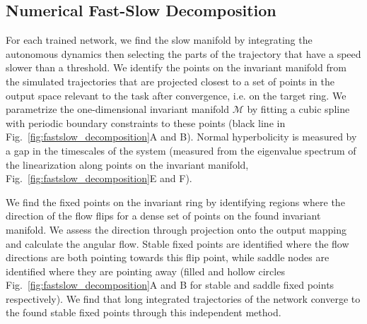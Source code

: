 \documentclass{article} %
\newcounter{ct}
\newcommand{\manifold}{\mathcal{M}}
\theoremstyle{definition}
\theoremstyle{remark}
\begin{document}
\subsection{Numerical Fast-Slow Decomposition}\label{sec:fastslowmethod}
For each trained network, we find the slow manifold by integrating the autonomous dynamics then selecting the parts of the trajectory that have a speed slower than a threshold.
We identify the points on the invariant manifold from the simulated trajectories that are projected closest to a set of points in the output space relevant to the task after convergence, i.e. on the target ring.
We parametrize the one-dimensional invariant manifold \(\manifold\) by fitting a cubic spline with periodic boundary constraints to these points (black line in Fig.~\ref{fig:fastslow_decomposition}A and B).
Normal hyperbolicity is measured by a gap in the timescales of the system (measured from the eigenvalue spectrum of the linearization along points on the invariant manifold, Fig.~\ref{fig:fastslow_decomposition}E and F).


We find the fixed points on the invariant ring by identifying regions where the direction of the flow flips for a dense set of points on the found invariant manifold.
We assess the direction through projection onto the output mapping and calculate the angular flow.
Stable fixed points are identified where the flow directions are both pointing towards this flip point,
while saddle nodes are identified where they are pointing away (filled and hollow circles Fig.~\ref{fig:fastslow_decomposition}A and B for stable and saddle fixed points respectively).
We find that long integrated trajectories of the network converge to the found stable fixed points through this independent method.
\end{document}
